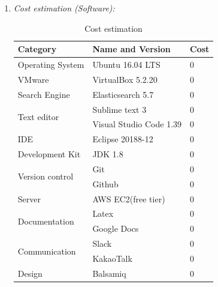 \documentclass[conference]{IEEEtran}
\begin{document}
\begin{enumerate}
  \item \textit{Cost estimation (Software): }
  \begin{table}[htbp]
  \renewcommand{\arraystretch}{1.5}
\caption{Cost estimation}
\begin{center}
\begin{tabular}{|p{3cm}|p{3.7cm}|p{0.5cm}|}
\hline
\textbf{Category       } & \textbf{Name and Version   } &\textbf{Cost} \\
\hline
Operating System &Ubuntu  16.04 LTS&0 \\
\hline
VMware & VirtualBox 5.2.20&0 \\
\hline
Search Engine & Elasticsearch 5.7 &0 \\
\hline
\multirow{2}{*}{Text editor} & Sublime text 3 &0 \\
& Visual Studio Code 1.39 &0  \\
\hline
IDE & Eclipse 20188-12 &0 \\
\hline
Development Kit & JDK 1.8 &0 \\
\hline
\multirow{2}{*}{Version control} & Git &0 \\
& Github &0 \\
\hline
Server & AWS EC2(free tier) &0\\
\hline
\multirow{2}{*}{Documentation}&  Latex &0\\
& Google Docs &0\\
\hline
\multirow{2}{*}{Communication} & Slack &0\\
& KakaoTalk &0\\
\hline
Design & Balsamiq&0\\
\hline
\end{tabular}
\label{tab1}
\end{center}
\end{table}
\end{enumerate}
 
\end{document}
